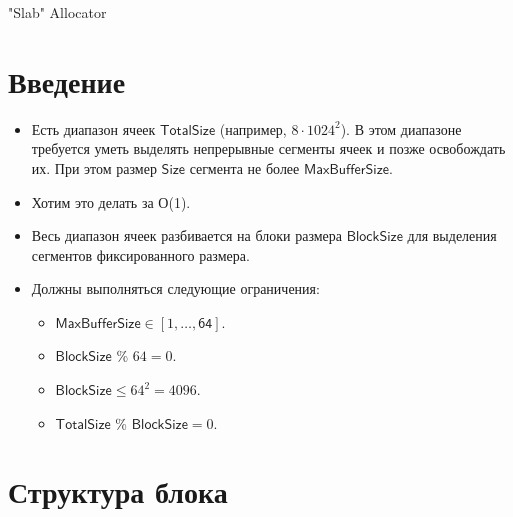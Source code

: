 \documentclass[12pt, a4paper]{article}
\begin{document}
	
	{\Huge "Slab" Allocator}
	
	\section{Введение}
	
	\begin{itemize}
		\item Есть диапазон ячеек $\textsf{TotalSize}$ (например, $8\cdot1024^2 $). В этом диапазоне
		требуется уметь выделять непрерывные сегменты ячеек и позже освобождать их. При этом размер
		$\textsf{Size}$ сегмента не более $\textsf{MaxBufferSize}$.
		
		\item Хотим это делать за О(1).
		
		\item Весь диапазон ячеек разбивается на блоки размера $\textsf{BlockSize}$ для выделения сегментов
		фиксированного размера.
		
		\item Должны выполняться следующие ограничения:
			\begin{itemize}
				\item $\textsf{MaxBufferSize} \in \left[ 1,\ldots ,\textsf{64}\right] $.
				\item $\textsf{BlockSize}$ \% $64 = 0$.
				\item $\textsf{BlockSize} \leq 64^2 = 4096.$
				\item $\textsf{TotalSize}$ \% $\textsf{BlockSize} = 0$.
		
			\end{itemize}
		
	\end{itemize}
	
	\section{Структура блока}
	
\end{document}

